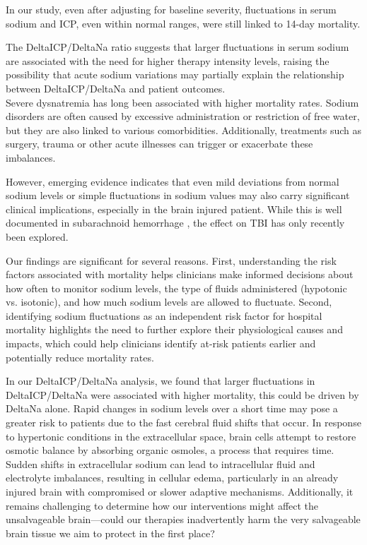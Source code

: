 In our study, even after adjusting for baseline severity, fluctuations in serum sodium and ICP, even within normal ranges, were still linked to 14-day mortality.

The DeltaICP/DeltaNa ratio suggests that larger fluctuations in serum sodium are associated with the need for higher therapy intensity levels, raising the possibility that acute sodium variations may partially explain the relationship between DeltaICP/DeltaNa and patient outcomes.\\

Severe dysnatremia has long been associated with higher mortality rates. Sodium disorders are often caused by excessive administration or restriction of free water, but they are also linked to various comorbidities. Additionally, treatments such as surgery\cite{marshallAssociationSodiumFluctuations2017}\cite{sakrFluctuationsSerumSodium2013}, trauma or other acute illnesses\cite{senSodiumVariabilityAssociated2017a} can trigger or exacerbate these imbalances.

However, emerging evidence\cite{darmonPrognosticConsequencesBorderline2013} indicates that even mild deviations from normal sodium levels or simple fluctuations in sodium values may also carry significant clinical implications, especially in the brain injured patient. While this is well documented in subarachnoid hemorrhage \cite{jinAssociationSerumSodium2022}\cite{labibSodiumItsImpact2024}\cite{balesEffectHyponatremiaSodium2016}\cite{topjianGreaterFluctuationsSerum2014}\cite{eaglesSignificanceFluctuationsSerum2019}\cite{haradaImpactHormonalDynamics2022}, the effect on TBI has only recently been explored\cite{harroisVariabilitySerumSodium2021a}.

Our findings are significant for several reasons. First, understanding the risk factors associated with mortality helps clinicians make informed decisions about how often to monitor sodium levels, the type of fluids administered (hypotonic vs. isotonic), and how much sodium levels are allowed to fluctuate. Second, identifying sodium fluctuations as an independent risk factor for hospital mortality highlights the need to further explore their physiological causes and impacts, which could help clinicians identify at-risk patients earlier and potentially reduce mortality rates.

In our DeltaICP/DeltaNa analysis, we found that larger fluctuations in DeltaICP/DeltaNa were associated with higher mortality, this could be driven by DeltaNa alone. Rapid changes in sodium levels over a short time may pose a greater risk to patients due to the fast cerebral fluid shifts that occur. In response to hypertonic conditions in the extracellular space, brain cells attempt to restore osmotic balance by absorbing organic osmoles, a process that requires time. Sudden shifts in extracellular sodium can lead to intracellular fluid and electrolyte imbalances, resulting in cellular edema, particularly in an already injured brain with compromised or slower adaptive mechanisms. Additionally, it remains challenging to determine how our interventions might affect the unsalvageable brain—could our therapies inadvertently harm the very salvageable brain tissue we aim to protect in the first place?

